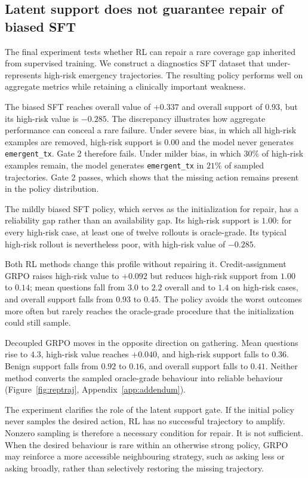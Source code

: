 \documentclass{article}
\begin{document}
\FloatBarrier
\subsection{Latent support does not guarantee repair of biased SFT}
\label{subsec:coverage}

The final experiment tests whether RL can repair a rare coverage gap inherited
from supervised training. We construct a diagnostics SFT dataset that under-represents high-risk emergency trajectories. The resulting policy performs well
on aggregate metrics while retaining a clinically important weakness.

The biased SFT reaches overall value of $+0.337$ and overall support of $0.93$,
but its high-risk value is $-0.285$. The discrepancy illustrates how aggregate
performance can conceal a rare failure. Under severe bias, in which all high-risk
examples are removed, high-risk support is $0.00$ and the model never generates
\texttt{emergent\_tx}. Gate 2 therefore fails. Under milder bias, in which
$30\%$ of high-risk examples remain, the model generates
\texttt{emergent\_tx} in $21\%$ of sampled trajectories. Gate 2 passes, which
shows that the missing action remains present in the policy distribution.

The mildly biased SFT policy, which serves as the initialization for repair, has a
reliability gap rather than an availability gap. Its high-risk support is $1.00$: for
every high-risk case, at least one of twelve rollouts is oracle-grade. Its typical
high-risk rollout is nevertheless poor, with high-risk value of $-0.285$.

Both RL methods change this profile without repairing it. Credit-assignment GRPO
raises high-risk value to $+0.092$ but reduces high-risk support from $1.00$ to
$0.14$; mean questions fall from $3.0$ to $2.2$ overall and to $1.4$ on high-risk
cases, and overall support falls from $0.93$ to $0.45$. The policy avoids the worst
outcomes more often but rarely reaches the oracle-grade procedure that the
initialization could still sample.

Decoupled GRPO moves in the opposite direction on gathering. Mean questions rise to
$4.3$, high-risk value reaches $+0.040$, and high-risk support falls to $0.36$. Benign
support falls from $0.92$ to $0.16$, and overall support falls to $0.41$. Neither
method converts the sampled oracle-grade behaviour into reliable behaviour
(Figure~\ref{fig:reptraj}, Appendix~\ref{app:addendum}).

The experiment clarifies the role of the latent support gate. If the initial
policy never samples the desired action, RL has no successful trajectory to
amplify. Nonzero sampling is therefore a necessary condition for repair. It is
not sufficient. When the desired behaviour is rare within an otherwise strong
policy, GRPO may reinforce a more accessible neighbouring strategy, such as
asking less or asking broadly, rather than selectively restoring the missing
trajectory.
\end{document}
